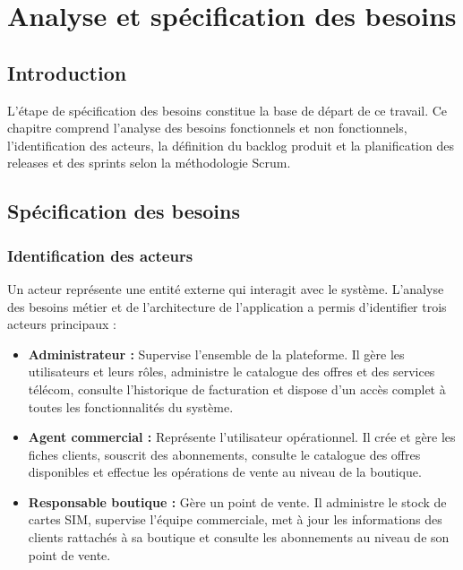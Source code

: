 \chapter{Analyse et spécification des besoins}

\section*{Introduction}

L'étape de spécification des besoins constitue la base de départ de ce travail. Ce chapitre comprend l'analyse des besoins fonctionnels et non fonctionnels, l'identification des acteurs, la définition du backlog produit et la planification des releases et des sprints selon la méthodologie Scrum.

\section{Spécification des besoins}

\subsection{Identification des acteurs}

Un acteur représente une entité externe qui interagit avec le système. L'analyse des besoins métier et de l'architecture de l'application a permis d'identifier trois acteurs principaux :

\begin{itemize}
\item[•] \textbf{Administrateur :} Supervise l'ensemble de la plateforme. Il gère les utilisateurs et leurs rôles, administre le catalogue des offres et des services télécom, consulte l'historique de facturation et dispose d'un accès complet à toutes les fonctionnalités du système.

\item[•] \textbf{Agent commercial :} Représente l'utilisateur opérationnel. Il crée et gère les fiches clients, souscrit des abonnements, consulte le catalogue des offres disponibles et effectue les opérations de vente au niveau de la boutique.

\item[•] \textbf{Responsable boutique :} Gère un point de vente. Il administre le stock de cartes SIM, supervise l'équipe commerciale, met à jour les informations des clients rattachés à sa boutique et consulte les abonnements au niveau de son point de vente.
\end{itemize}

